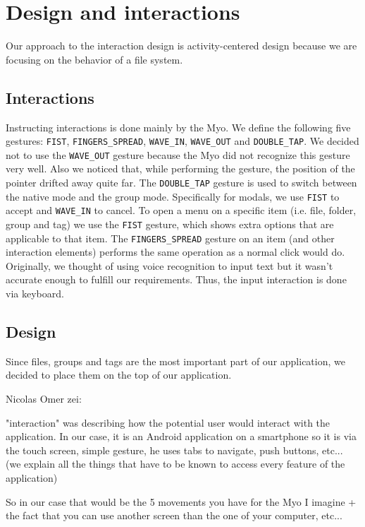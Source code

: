 \documentclass{article}
\begin{document}
\section{Design and interactions}

Our approach to the interaction design is activity-centered design because we are focusing on the behavior of a file system. 

\subsection{Interactions}
Instructing interactions is done mainly by the Myo. We define the following five gestures: \texttt{FIST}, \texttt{FINGERS\_SPREAD}, \texttt{WAVE\_IN}, \texttt{WAVE\_OUT} and \texttt{DOUBLE\_TAP}. We decided not to use the \texttt{WAVE\_OUT} gesture because the Myo did not recognize this gesture very well. Also we noticed that, while performing the gesture, the position of the pointer drifted away quite far. The \texttt{DOUBLE\_TAP} gesture is used to switch between the native mode and the group mode. Specifically for modals, we use \texttt{FIST} to accept and \texttt{WAVE\_IN} to cancel. To open a menu on a specific item (i.e. file, folder, group and tag) we use the \texttt{FIST} gesture, which shows extra options that are applicable to that item. The \texttt{FINGERS\_SPREAD} gesture on an item (and other interaction elements) performs the same operation as a normal click would do. Originally, we thought of using voice recognition to input text but it wasn't accurate enough to fulfill our requirements. Thus, the input interaction is done via keyboard.

\subsection{Design}

Since files, groups and tags are the most important part of our application, we decided to place them on the top of our application.

 Nicolas Omer zei:

"interaction" was describing how the potential user would interact with the application. In our case, it is an Android application on a smartphone so it is via the touch screen, simple gesture, he uses tabs to navigate, push buttons, etc... (we explain all the things that have to be known to access every feature of the application)

So in our case that would be the 5 movements you have for the Myo I imagine + the fact that you can use another screen than the one of your computer, etc...
\end{document}
